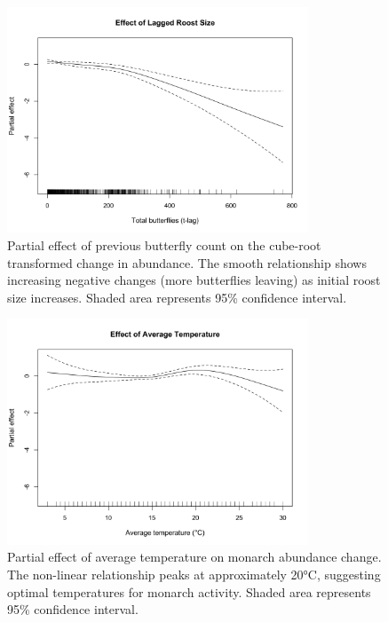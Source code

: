 \begin{figure}[htbp]
\centering
\includegraphics[width=0.8\textwidth]{supplemental/results/thesis_exports/figures/effect_lagged_roost_size.png}
\caption{Partial effect of previous butterfly count on the cube-root transformed change in abundance. The smooth relationship shows increasing negative changes (more butterflies leaving) as initial roost size increases. Shaded area represents 95\% confidence interval.}
\label{fig:effect_roost_size}
\end{figure}

\begin{figure}[htbp]
\centering
\includegraphics[width=0.8\textwidth]{supplemental/results/thesis_exports/figures/effect_temperature.png}
\caption{Partial effect of average temperature on monarch abundance change. The non-linear relationship peaks at approximately 20°C, suggesting optimal temperatures for monarch activity. Shaded area represents 95\% confidence interval.}
\label{fig:effect_temperature}
\end{figure}

